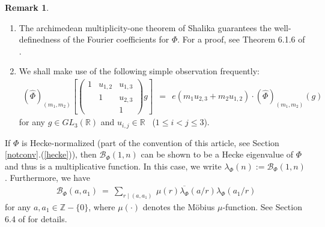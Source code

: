 \documentclass[11pt,reqno]{amsart}
\theoremstyle{definition}
\theoremstyle{definition}
\newtheorem{rem}[thm]{Remark}
\theoremstyle{remark}
\newcommand{\R}{\ensuremath{\mathbb{R}}}
\newcommand{\Z}{\ensuremath{\mathbb{Z}}}
\numberwithin{equation}{section}
\begin{document}
\begin{rem}\label{heckeigdef}
	\
	\begin{enumerate}
		\item The archimedean multiplicity-one theorem of Shalika  guarantees  the well-definedness of the Fourier coefficients for $\Phi$.  For a proof, see  Theorem 6.1.6 of \cite{Go15}. 
		
		\item We shall make use of the following simple observation frequently:
		\begin{align}\label{unipotran}
			(\widehat{\Phi})_{(m_{1}, m_{2})}\left[ \begin{pmatrix}
				1 & u_{1,2} & u_{1,3} \\
				&     1      & u_{2,3} \\
				&             & 1
			\end{pmatrix} 
			g\right] \  \ = \ \  e\left(m_{1}u_{2,3}+m_{2}u_{1,2}\right) \cdot 	(\widehat{\Phi})_{(m_{1}, m_{2})}(g)
		\end{align}
		for any $g\in GL_{3}(\R)$ and  $u_{i,j}\in \R$ \ ($1\le i<j\le 3$). 
		
	\end{enumerate}
	

	
\end{rem}

 If $\Phi$ is Hecke-normalized (part of the convention of this article, see Section \ref{notconv}.(\ref{hecke})), then $\mathcal{B}_{\Phi}(1,n)$ can be shown to be a Hecke eigenvalue of $\Phi$ and thus is a multiplicative function. In this case, we  write $\lambda_{\Phi}(n):= \mathcal{B}_{\Phi}(1,n)$.  Furthermore, we have
\begin{align}\label{splGL3Hec}
	\mathcal{B}_{\Phi}(a, a_{1}) \ = \  \sum\limits_{r \mid (a, a_{1})} \ \mu(r) \overline{\lambda_{\Phi}}(a/r) \lambda_{\Phi}(a_{1}/r)
\end{align}
for any $a, a_{1}\in \Z-\{0\}$, where $\mu(\cdot)$ denotes the M\"obius $\mu$-function.  See  Section 6.4 of \cite{Go15} for  details. 














\end{document}

